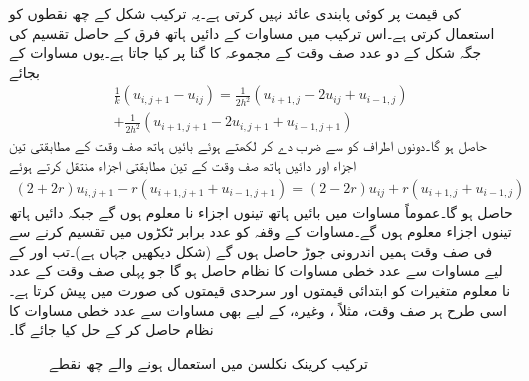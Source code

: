 کی قیمت پر   کوئی پابندی عائد نہیں کرتی ہے۔یہ ترکیب شکل  کے چھ نقطوں کو استعمال کرتی ہے۔اس ترکیب میں مساوات  کے دائیں ہاتھ فرق کے حاصل تقسیم کی جگہ شکل  کے دو عدد صف  وقت کے مجموعہ کا  گنا  پر کیا جاتا ہے۔یوں مساوات  کے بجائے
\begin{multline}
\frac{1}{k}(u_{i,j+1}-u_{ij})=\frac{1}{2h^2}(u_{i+1,j}-2u_{ij}+u_{i-1,j})\\
+\frac{1}{2h^2}(u_{i+1,j+1}-2u_{i,j+1}+u_{i-1,j+1})
\end{multline}
حاصل ہو گا۔دونوں اطراف کو  سے ضرب دے کر  لکھتے ہوئے بائیں ہاتھ صف وقت  کے مطابقتی تین اجزاء اور دائیں ہاتھ صف وقت  کے تین مطابقتی اجزاء منتقل کرتے ہوئے
\begin{align}\label{مساوات_اعدادی_کرینک_نکلسن_الف}
(2+2r)u_{i,j+1}-r(u_{i+1,j+1}+u_{i-1,j+1})=(2-2r)u_{ij}+r(u_{i+1,j}+u_{i-1,j})
\end{align}
حاصل ہو گا۔عموماً مساوات  میں بائیں ہاتھ تینوں اجزاء نا معلوم ہوں گے جبکہ دائیں ہاتھ تینوں اجزاء معلوم ہوں گے۔مساوات  کے وقفہ  کو  عدد برابر ٹکڑوں میں تقسیم کرنے سے فی صف وقت ہمیں  اندرونی جوڑ حاصل ہوں گے (شکل  دیکھیں جہاں  ہے)۔تب  اور  کے لیے  مساوات  سے   عدد خطی مساوات کا نظام  حاصل ہو گا جو پہلی صف وقت کے  عدد نا معلوم متغیرات  کو  ابتدائی قیمتوں  اور سرحدی قیمتوں  کی صورت میں پیش کرتا ہے۔ اسی طرح ہر صف وقت، مثلاً ،  وغیرہ، کے لیے بھی مساوات  سے   عدد خطی مساوات کا نظام حاصل کر کے   حل کیا جائے گا۔ 
\begin{figure}
\centering
{}
\caption{ترکیب کرینک نکلسن میں استعمال ہونے والے چھ نقطے}
\label{شکل_اعدادی_ترکیب_کرینک_نکلسن}
\end{figure}


